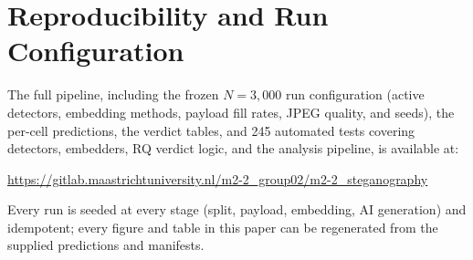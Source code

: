 \documentclass[10pt,twocolumn,a4paper]{article}
\begin{document}
\section{Reproducibility and Run Configuration}
\label{app:reproducibility}
\label{app:config}
The full pipeline, including the frozen $N\!=\!3{,}000$ run configuration (active detectors, embedding methods, payload fill rates, JPEG quality, and seeds), the per-cell predictions, the verdict tables, and 245 automated tests covering detectors, embedders, RQ verdict logic, and the analysis pipeline, is available at:
\begin{center}
\url{https://gitlab.maastrichtuniversity.nl/m2-2_group02/m2-2_steganography}
\end{center}
\noindent Every run is seeded at every stage (split, payload, embedding, AI generation) and idempotent; every figure and table in this paper can be regenerated from the supplied predictions and manifests.
\end{document}
